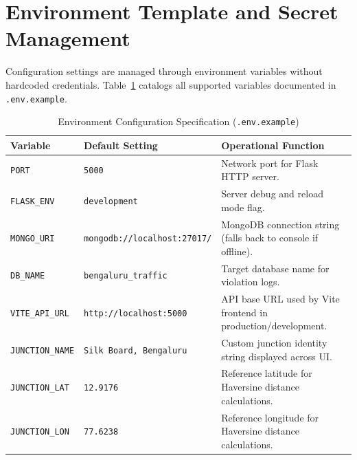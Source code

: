 \section{Environment Template and Secret Management}
Configuration settings are managed through environment variables without hardcoded credentials. Table~\ref{tab:env_vars} catalogs all supported variables documented in \texttt{.env.example}.

\begin{table}[h!]
\centering
\small
\begin{tabularx}{\textwidth}{l p{4.2cm} X}
\toprule
\textbf{Variable} & \textbf{Default Setting} & \textbf{Operational Function} \\
\midrule
\texttt{PORT} & \texttt{5000} & Network port for Flask HTTP server. \\
\texttt{FLASK\_ENV} & \texttt{development} & Server debug and reload mode flag. \\
\texttt{MONGO\_URI} & \texttt{mongodb://localhost:27017/} & MongoDB connection string (falls back to console if offline). \\
\texttt{DB\_NAME} & \texttt{bengaluru\_traffic} & Target database name for violation logs. \\
\texttt{VITE\_API\_URL} & \texttt{http://localhost:5000} & API base URL used by Vite frontend in production/development. \\
\texttt{JUNCTION\_NAME} & \texttt{Silk Board, Bengaluru} & Custom junction identity string displayed across UI. \\
\texttt{JUNCTION\_LAT} & \texttt{12.9176} & Reference latitude for Haversine distance calculations. \\
\texttt{JUNCTION\_LON} & \texttt{77.6238} & Reference longitude for Haversine distance calculations. \\
\bottomrule
\end{tabularx}
\caption{Environment Configuration Specification (\texttt{.env.example})}
\label{tab:env_vars}
\end{table}

